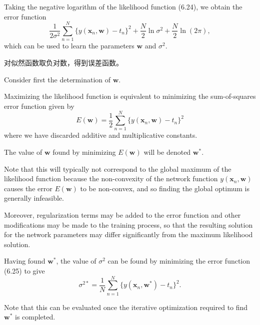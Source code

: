 \documentclass{article}
\begin{document}
Taking the negative logarithm of the likelihood function (6.24), we obtain the error function
\begin{equation}
\frac{1}{2\sigma^2} \sum_{n=1}^N \{y(\mathbf{x}_n, \mathbf{w}) - t_n\}^2 + \frac{N}{2} \ln \sigma^2 + \frac{N}{2} \ln(2\pi),
\tag{6.25}
\end{equation}
which can be used to learn the parameters $\mathbf{w}$ and $\sigma^2$. 

{\color{red}
对似然函数取负对数，得到误差函数。
}

Consider first the determination of $\mathbf{w}$. 

Maximizing the likelihood function is equivalent to minimizing the sum-of-squares error function given by
\begin{equation}
E(\mathbf{w}) = \frac{1}{2} \sum_{n=1}^N \{y(\mathbf{x}_n, \mathbf{w}) - t_n\}^2
\tag{6.26}
\end{equation}
where we have discarded additive and multiplicative constants. 

The value of $\mathbf{w}$ found by minimizing $E(\mathbf{w})$ will be denoted $\mathbf{w}^*$. 

Note that this will typically not correspond to the global maximum of the likelihood function because the non-convexity of the network function $y(\mathbf{x}_n, \mathbf{w})$ causes the error $E(\mathbf{w})$ to be non-convex, and so finding the global optimum is generally infeasible. 

Moreover, regularization terms may be added to the error function and other modifications may be made to the training process, so that the resulting solution for the network parameters may differ significantly from the maximum likelihood solution.

Having found $\mathbf{w}^*$, the value of $\sigma^2$ can be found by minimizing the error function (6.25) to give
\begin{equation}
\sigma^{2*} = \frac{1}{N} \sum_{n=1}^N \{y(\mathbf{x}_n, \mathbf{w}^*) - t_n\}^2.
\tag{6.27}
\end{equation}

Note that this can be evaluated once the iterative optimization required to find $\mathbf{w}^*$ is completed.
\end{document}
